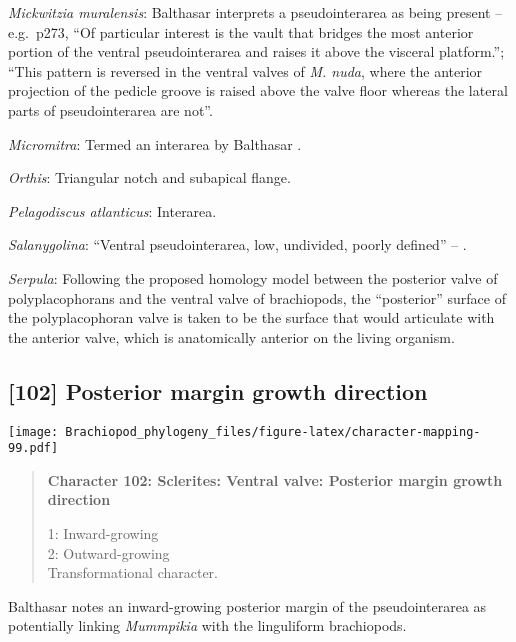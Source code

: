 \documentclass[openany]{book}
\theoremstyle{definition}
\theoremstyle{definition}
\theoremstyle{definition}
\theoremstyle{remark}
\begin{document}
\hypertarget{Mickwitzia_muralensis-coding-101}{}
\emph{Mickwitzia muralensis}: Balthasar
\citeyearpar{Balthasar2008iMummpikia} interprets a pseudointerarea as
being present -- e.g.~p273, ``Of particular interest is the vault that
bridges the most anterior portion of the ventral pseudointerarea and
raises it above the visceral platform.''; ``This pattern is reversed in
the ventral valves of \emph{M. nuda}, where the anterior projection of
the pedicle groove is raised above the valve floor whereas the lateral
parts of pseudointerarea are not''.

\hypertarget{Micromitra-coding-101}{}
\emph{Micromitra}: Termed an interarea by Balthasar
\citeyearpar{Balthasar2004Shellstructure}.

\hypertarget{Orthis-coding-101}{}
\emph{Orthis}: Triangular notch and subapical flange.

\hypertarget{Pelagodiscus_atlanticus-coding-101}{}
\emph{Pelagodiscus atlanticus}: Interarea.

\hypertarget{Salanygolina-coding-101}{}
\emph{Salanygolina}: ``Ventral pseudointerarea, low, undivided, poorly
defined'' -- \citet{Williams2000LinguliformeaCraniiformea}.

\hypertarget{Serpula-coding-101}{}
\emph{Serpula}: Following the proposed homology model between the
posterior valve of polyplacophorans and the ventral valve of
brachiopods, the ``posterior'' surface of the polyplacophoran valve is
taken to be the surface that would articulate with the anterior valve,
which is anatomically anterior on the living organism.

\subsection*{{[}102{]} Posterior margin growth
direction}\label{posterior-margin-growth-direction}

\texttt{[image: Brachiopod\_phylogeny\_files/figure-latex/character-mapping-99.pdf]}

\begin{quote}
\textbf{Character 102: Sclerites: Ventral valve: Posterior margin growth
direction}

1: Inward-growing\\
2: Outward-growing\\
Transformational character.
\end{quote}

Balthasar \citeyearpar{Balthasar2008iMummpikia} notes an inward-growing
posterior margin of the pseudointerarea as potentially linking
\emph{Mummpikia} with the linguliform brachiopods.
\end{document}
